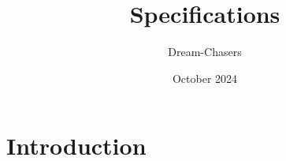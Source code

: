 \documentclass{article}
\title{Specifications}
\author{Dream-Chasers}
\date{October 2024}
\begin{document}
\maketitle 

\section{Introduction}
\end{document}
